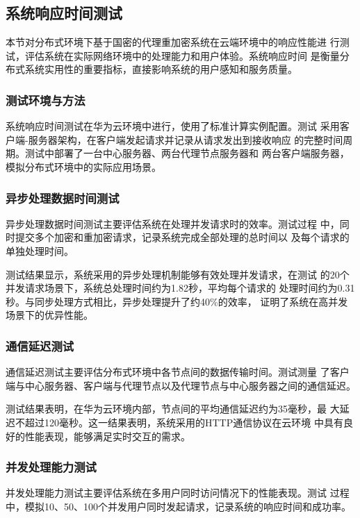 \subsection{系统响应时间测试}

本节对分布式环境下基于国密的代理重加密系统在云端环境中的响应性能进
行测试，评估系统在实际网络环境中的处理能力和用户体验。系统响应时间
是衡量分布式系统实用性的重要指标，直接影响系统的用户感知和服务质量。

\subsubsection{测试环境与方法}

系统响应时间测试在华为云环境中进行，使用了标准计算实例配置。测试
采用客户端-服务器架构，在客户端发起请求并记录从请求发出到接收响应
的完整时间周期。测试中部署了一台中心服务器、两台代理节点服务器和
两台客户端服务器，模拟分布式环境中的实际应用场景。

\subsubsection{异步处理数据时间测试}

异步处理数据时间测试主要评估系统在处理并发请求时的效率。测试过程
中，同时提交多个加密和重加密请求，记录系统完成全部处理的总时间以
及每个请求的单独处理时间。

测试结果显示，系统采用的异步处理机制能够有效处理并发请求，在测试
的20个并发请求场景下，系统总处理时间约为1.82秒，平均每个请求的
处理时间约为0.31秒。与同步处理方式相比，异步处理提升了约40\%的效率，
证明了系统在高并发场景下的优异性能。

\subsubsection{通信延迟测试}

通信延迟测试主要评估分布式环境中各节点间的数据传输时间。测试测量
了客户端与中心服务器、客户端与代理节点以及代理节点与中心服务器之间的通信延迟。

测试结果表明，在华为云环境内部，节点间的平均通信延迟约为35毫秒，最
大延迟不超过120毫秒。这一结果表明，系统采用的HTTP通信协议在云环境
中具有良好的性能表现，能够满足实时交互的需求。

\subsubsection{并发处理能力测试}

并发处理能力测试主要评估系统在多用户同时访问情况下的性能表现。测试
过程中，模拟10、50、100个并发用户同时发起请求，记录系统的响应时间和成功率。

